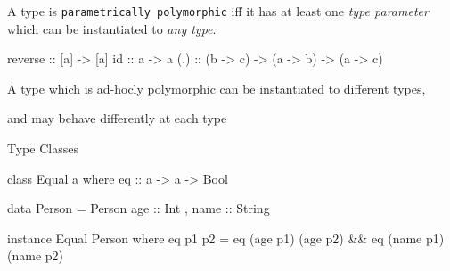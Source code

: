 \documentclass[usenames,dvipsnames,svgnames,table,aspectratio=169,mathserif]{beamer}
\newcommand{\nl}{\vspace{\baselineskip}}
\newcommand{\pnl}{\pause \nl}
\begin{document}
\begin{frame}[fragile]


A type is {\tt parametrically polymorphic} iff it has at least one {\it type parameter}
which can be instantiated to {\it any type}.




\begin{haskellcode}
reverse :: [a] -> [a]
id :: a -> a
(.) :: (b -> c) -> (a -> b) -> (a -> c)
\end{haskellcode}

\end{frame}


\begin{frame}[fragile]

A type which is ad-hocly polymorphic can be instantiated to different types,

and may behave differently at each type

\end{frame}



\begin{frame}
\begin{center}
\huge{Type Classes}
\end{center}
\end{frame}


\begin{frame}[fragile]
\begin{haskellcode}
class Equal a where
  eq :: a -> a -> Bool
\end{haskellcode}

\pnl

\begin{haskellcode}
data Person = Person {
  age :: Int
, name :: String
}
\end{haskellcode}

\pnl

\begin{haskellcode}
instance Equal Person where
  eq p1 p2 = eq (age p1) (age p2) && eq (name p1) (name p2)
\end{haskellcode}

\end{frame}
\end{document}

